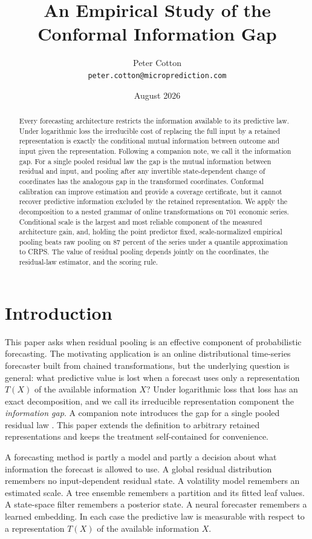 \documentclass[11pt]{article}
\title{An Empirical Study of the Conformal Information Gap}
\author{Peter Cotton\\\texttt{peter.cotton@microprediction.com}}
\date{August 2026}
\theoremstyle{remark}
\begin{document}
\maketitle

\begin{abstract}
Every forecasting architecture restricts the information available to its predictive law.
Under logarithmic loss the irreducible cost of replacing the full input by a retained
representation is exactly the conditional mutual information between outcome and input given
the representation. Following a companion note, we call it the information gap. For a single pooled residual law the gap
is the mutual information between residual and input, and pooling after any invertible
state-dependent change of coordinates has the analogous gap in the transformed coordinates.
Conformal calibration can improve estimation and provide a coverage certificate, but it
cannot recover predictive information excluded by the retained representation. We apply the decomposition to a
nested grammar of online transformations on 701 economic series. Conditional scale is the
largest and most reliable component of the measured architecture gain, and, holding the point
predictor fixed, scale-normalized empirical pooling beats raw pooling on 87 percent of the
series under a quantile approximation to CRPS. The value of residual pooling depends jointly
on the coordinates, the residual-law estimator, and the scoring rule.
\end{abstract}

\section{Introduction}\label{sec:intro}

This paper asks when residual pooling is an effective component of probabilistic
forecasting. The motivating application is an online distributional time-series forecaster
built from chained transformations, but the underlying question is general: what predictive
value is lost when a forecast uses only a representation $T(X)$ of the available information
$X$? Under logarithmic loss that loss has an exact decomposition, and we call its irreducible
representation component the \emph{information gap}. A companion note introduces the gap
for a single pooled residual law \citep{cotton2026marginally}. This paper extends the
definition to arbitrary retained representations and keeps the treatment self-contained for
convenience.

A forecasting method is partly a model and partly a decision about what information the forecast
is allowed to use. A global residual distribution remembers no input-dependent residual state. A
volatility model remembers an estimated scale. A tree ensemble remembers a partition and its
fitted leaf values. A state-space filter remembers a posterior state. A neural forecaster
remembers a learned embedding. In each case the predictive law is measurable with respect to a
representation $T(X)$ of the available information $X$.
\end{document}

